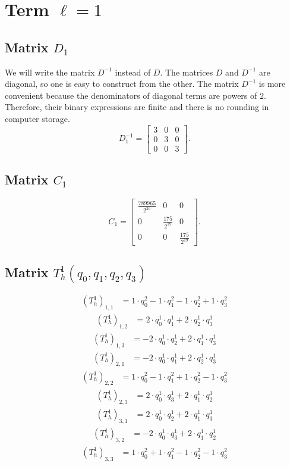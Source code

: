 \section{Term $\ell=1$}
\subsection{Matrix $D_1$}
We will write the matrix $D^{-1}$ instead of $D$. The matrices $D$ and $D^{-1}$ are diagonal, so one is easy to construct from the other. The matrix $D^{-1}$ is more convenient because the denominators of diagonal terms are powers of $2$. Therefore, their binary expressions are finite and there is no rounding in computer storage.\[D_1^{-1}=\left[\begin{array}{ccc}
3 & 0 & 0\\
0 & 3 & 0\\
0 & 0 & 3
\end{array}\right].\]
\subsection{Matrix $C_1$}
\[C_1=\left[\begin{array}{ccc}
\frac{789965}{2^{20}} & 0 & 0\\
0 & \frac{175}{2^{19}} & 0\\
0 & 0 & \frac{175}{2^{19}}
\end{array}\right].\]
\subsection{Matrix $T_{h}^1(q_0,q_1,q_2,q_3)$}
\begin{align*}(T_{h}^1)_{1,1}&=1\cdot q_0^{2}-1\cdot q_1^{2}-1\cdot q_2^{2}+1\cdot q_3^{2}\end{align*}
\begin{align*}(T_{h}^1)_{1,2}&=2\cdot q_0^{1}\cdot q_1^{1}+2\cdot q_2^{1}\cdot q_3^{1}\end{align*}
\begin{align*}(T_{h}^1)_{1,3}&=-2\cdot q_0^{1}\cdot q_2^{1}+2\cdot q_1^{1}\cdot q_3^{1}\end{align*}
\begin{align*}(T_{h}^1)_{2,1}&=-2\cdot q_0^{1}\cdot q_1^{1}+2\cdot q_2^{1}\cdot q_3^{1}\end{align*}
\begin{align*}(T_{h}^1)_{2,2}&=1\cdot q_0^{2}-1\cdot q_1^{2}+1\cdot q_2^{2}-1\cdot q_3^{2}\end{align*}
\begin{align*}(T_{h}^1)_{2,3}&=2\cdot q_0^{1}\cdot q_3^{1}+2\cdot q_1^{1}\cdot q_2^{1}\end{align*}
\begin{align*}(T_{h}^1)_{3,1}&=2\cdot q_0^{1}\cdot q_2^{1}+2\cdot q_1^{1}\cdot q_3^{1}\end{align*}
\begin{align*}(T_{h}^1)_{3,2}&=-2\cdot q_0^{1}\cdot q_3^{1}+2\cdot q_1^{1}\cdot q_2^{1}\end{align*}
\begin{align*}(T_{h}^1)_{3,3}&=1\cdot q_0^{2}+1\cdot q_1^{2}-1\cdot q_2^{2}-1\cdot q_3^{2}\end{align*}
